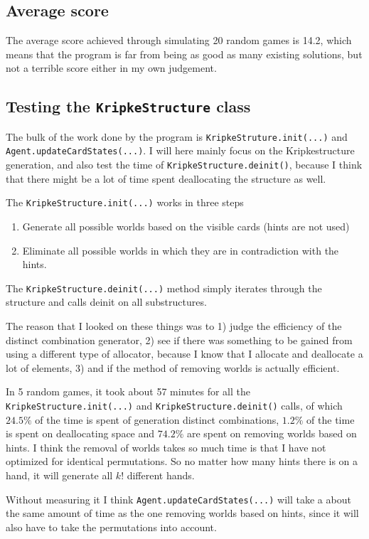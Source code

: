 \subsection{Average score}
The average score achieved through simulating 20 random games is 14.2, which means that the program is far from being as good as many existing solutions, but not a terrible score either in my own judgement. 

\subsection{Testing the {\tt KripkeStructure} class} \label{sec:testing-kripkestructure-class}
The bulk of the work done by the program is {\tt KripkeStruture.init(...)} and {\tt Agent.updateCardStates(...)}. I will here mainly focus on the Kripkestructure generation, and also test the time of {\tt KripkeStructure.deinit()}, because I think that there might be a lot of time spent deallocating the structure as well.

The {\tt KripkeStructure.init(...)} works in three steps
\begin{enumerate}
	\item Generate all possible worlds based on the visible cards (hints are not used)
	\item Eliminate all possible worlds in which they are in contradiction with the hints.
\end{enumerate}

The {\tt KripkeStructure.deinit(...)} method simply iterates through the structure and calls deinit on all substructures.

The reason that I looked on these things was to 1) judge the efficiency of the distinct combination generator, 2) see if there was something to be gained from using a different type of allocator, because I know that I allocate and deallocate a lot of elements, 3) and if the method of removing worlds is actually efficient.

In 5 random games, it took about 57 minutes for all the {\tt KripkeStructure.init(...)} and {\tt KripkeStructure.deinit()} calls,
of which $24.5\%$ of the time is spent of generation distinct combinations, $1.2\%$ of the time is spent on deallocating space and $74.2\%$ are spent on removing worlds based on hints. I think the removal of worlds takes so much time is that I have not optimized for identical permutations. So no matter how many hints there is on a hand, it will generate all $k!$ different hands.

Without measuring it I think {\tt Agent.updateCardStates(...)} will take a about the same amount of time as the one removing worlds based on hints, since it will also have to take the permutations into account.




